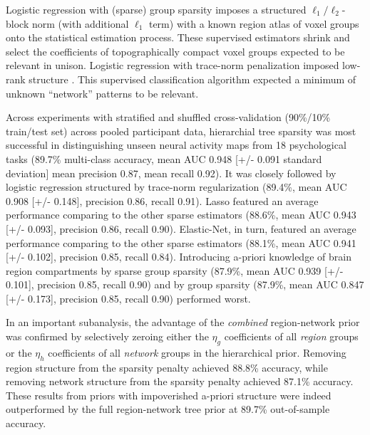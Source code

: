 \documentclass[runningheads,a4paper]{llncs}
\begin{document}
Logistic regression with (sparse) group sparsity
imposes a structured $\ell_1/\ell_2$-block norm (with additional $\ell_1$ term)
with a known region atlas of voxel groups
onto the statistical estimation process.
These supervised estimators shrink and select the coefficients
of topographically compact voxel groups expected to
be relevant in unison.
%
Logistic regression with trace-norm penalization
imposed low-rank structure \cite{harchaoui2012large}.
This supervised classification algorithm
expected a minimum of unknown ``network'' patterns
to be relevant.

%


Across experiments with stratified and shuffled
cross-validation (90\%/10\% train/test set) across pooled participant data,
hierarchial tree sparsity was most successful
in distinguishing unseen neural activity maps from 18 psychological tasks
(89.7\% multi-class accuracy, mean AUC 0.948 [+/- 0.091 standard deviation]
mean precision 0.87, mean recall 0.92).
It was closely followed by logistic regression
structured by trace-norm regularization
(89.4\%, mean AUC 0.908 [+/- 0.148],
precision 0.86, recall 0.91).
Lasso featured an average performance comparing to the other sparse estimators
(88.6\%, mean AUC 0.943 [+/- 0.093],
precision 0.86, recall 0.90).
Elastic-Net, in turn, featured an
average performance comparing to the other sparse estimators
(88.1\%, mean AUC 0.941 [+/- 0.102],
precision 0.85, recall 0.84).
Introducing a-priori knowledge of brain region compartments
by sparse group sparsity
(87.9\%, mean AUC 0.939 [+/- 0.101], precision 0.85, recall 0.90)
and
by group sparsity
(87.9\%, mean AUC 0.847 [+/- 0.173], precision 0.85, recall 0.90)
performed worst.



In an important subanalysis,
the advantage of the \textit{combined} region-network prior was confirmed by
selectively zeroing
either the $\eta_g$ coefficients of all \textit{region} groups
or the $\eta_h$ coefficients of all \textit{network} groups in the hierarchical prior.
Removing region structure from the sparsity penalty achieved
88.8\% accuracy,
while removing network structure from the sparsity penalty achieved
87.1\% accuracy.
These results from priors with impoverished a-priori structure
were indeed outperformed by
the full region-network tree prior at 89.7\% out-of-sample accuracy.
\end{document}
